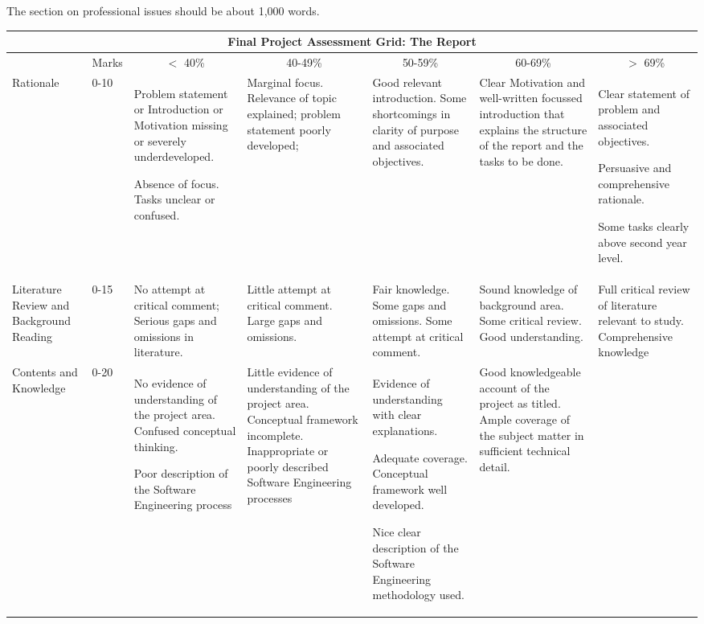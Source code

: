 \documentclass[11pt]{article}
\newcommand{\profIssuesLength}{1,000 }
\begin{document}
The section on professional issues should be about \profIssuesLength words.

{\small
\noindent
\begin{tabular}{||p{2cm}|p{0.8cm}|p{2.9cm}|p{2.9cm}|p{2.9cm}|p{2.9cm}|p{2.9cm}||}
\hline
\hline
\multicolumn{7}{||c||}{\normalsize \bf Final Project Assessment Grid: The Report}\\
\hline
\hline
& Marks &  \multicolumn{1}{|c|}{$<$ 40\%} &
  \multicolumn{1}{|c|}{40-49\%} &
  \multicolumn{1}{|c|}{50-59\%} &
  \multicolumn{1}{|c|}{60-69\%} &
  \multicolumn{1}{|c||}{$>$ 69\%}\\
\hline
Rationale & 0-10 & Problem statement or Introduction or Motivation missing or
severely underdeveloped.

Absence of focus. Tasks unclear or confused. &
Marginal focus. Relevance
of topic explained; problem
statement poorly
developed; &
Good relevant introduction.
Some shortcomings in clarity of
purpose and associated
objectives. &
Clear Motivation and well-written focussed introduction that explains the structure of the report and the tasks to be done.
 &
Clear statement of problem
and associated objectives.

Persuasive and
comprehensive rationale.

Some tasks clearly above second year level.\\
\hline
Literature Review  and Background Reading & 0-15 &No attempt at critical
comment; Serious gaps
and omissions in literature.
&Little attempt at critical
comment. Large gaps and
omissions.
&Fair knowledge. Some
gaps and omissions.
Some attempt at critical
comment.
&Sound knowledge of background
area. Some critical
review. Good understanding.
&Full critical review of
literature relevant to study.
Comprehensive knowledge
\\
\hline
Contents and Knowledge
 & 0-20 &
 No evidence of understanding of the
project area.
Confused conceptual
thinking.

 Poor description of the Software Engineering process
&
Little evidence of understanding of the
project area.
Conceptual framework
incomplete. Inappropriate
or poorly described Software Engineering processes
&
Evidence of understanding with clear explanations.

Adequate coverage.  Conceptual framework well developed.

Nice clear description of the Software Engineering methodology used.
&
Good knowledgeable account
of the project as titled. Ample
coverage of the subject matter
in sufficient technical detail.


\end{tabular}}
\end{document}
